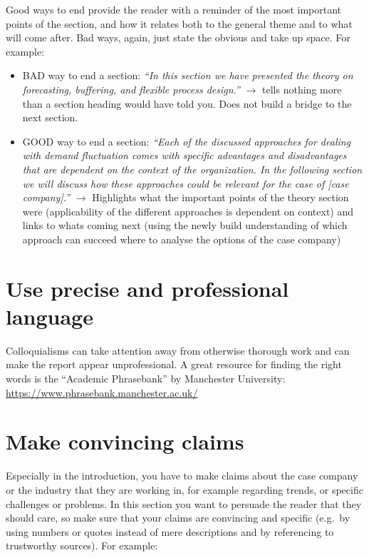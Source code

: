 \documentclass[
]{book}
\begin{document}
Good ways to end provide the reader with a reminder of the most
important points of the section, and how it relates both to the
general theme and to what will come after. Bad ways, again, just state
the obvious and take up space. For example:

\begin{itemize}
\item
  BAD way to end a section: \emph{``In this section we have presented the theory on forecasting, buffering, and flexible process design.''}
  \(\rightarrow\) tells nothing more than a section heading would have told you.
  Does not build a bridge to the next section.
\item
  GOOD way to end a section: \emph{``Each of the discussed approaches for dealing with demand fluctuation comes with specific advantages and disadvantages that are dependent on the context of the organization. In the following section we will discuss how these approaches could be relevant for the case of {[}case company{]}.''} \(\rightarrow\)
  Highlights what the important points of the theory section were
  (applicability of the different approaches is dependent on
  context) and links to whats coming next (using the newly build
  understanding of which approach can succeed where to analyse the
  options of the case company)
\end{itemize}

\hypertarget{use-precise-and-professional-language}{%
\section{Use precise and professional language}\label{use-precise-and-professional-language}}

Colloquialisms can take
attention away from otherwise thorough work and can make the report
appear unprofessional. A great resource for finding the right words
is the ``Academic Phrasebank'' by Manchester University:
\url{https://www.phrasebank.manchester.ac.uk/}

\hypertarget{make-convincing-claims}{%
\section{Make convincing claims}\label{make-convincing-claims}}

Especially in the introduction, you have
to make claims about the case company or the industry that they are
working in, for example regarding trends, or specific challenges or
problems. In this section you want to persuade the reader that they
should care, so make sure that your claims are convincing and
specific (e.g.~by using numbers or quotes instead of mere
descriptions and by referencing to trustworthy sources). For
example:
\end{document}
